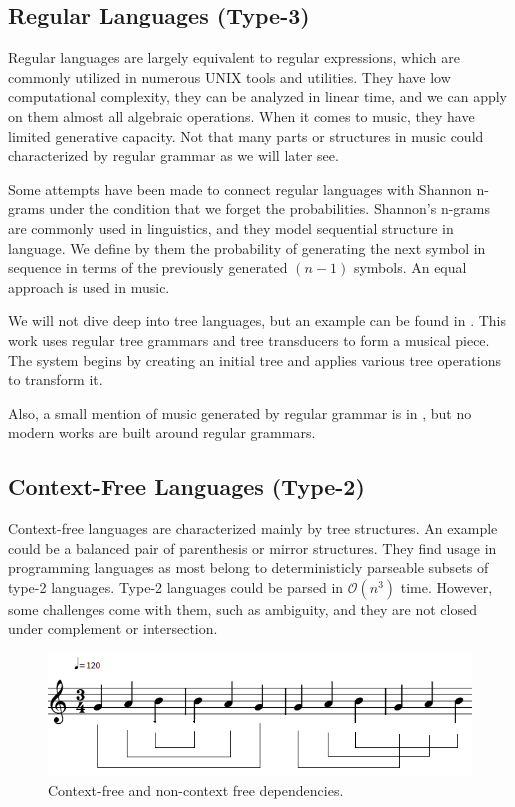 \subsection*{Regular Languages (Type-3)}
Regular languages are largely equivalent to regular expressions, which are commonly utilized in numerous UNIX tools and utilities. They have low computational complexity, they can be analyzed in linear time, and we can apply on them almost all algebraic operations. When it comes to music, they have limited generative capacity. Not that many parts or structures in music could characterized by regular grammar as we will later see.

Some attempts have been made to connect regular languages with Shannon n-grams \cite{musiclanguageanimals} under the condition that we forget the probabilities. Shannon's n-grams are commonly used in linguistics, and they model sequential structure in language. We define by them the probability of generating the next symbol in sequence in terms of the previously generated $(n - 1)$ symbols. An equal approach is used in music.

We will not dive deep into tree languages, but an example can be found in \cite{africathesis}. This work uses regular tree grammars and tree transducers to form a musical piece. The system begins by creating an initial tree and applies various tree operations to transform it.

Also, a small mention of music generated by regular grammar is in \cite{gramimprovisation}, but no modern works are built around regular grammars.

\subsection*{Context-Free Languages (Type-2)}
Context-free languages are characterized mainly by tree structures. An example could be a balanced pair of parenthesis or mirror structures. They find usage in programming languages as most belong to deterministicly parseable subsets of type-2 languages. Type-2 languages could be parsed in $\mathcal{O}(n^3)$ time. However, some challenges come with them, such as ambiguity, and they are not closed under complement or intersection.

\begin{figure}[H]
    \centering
    \includegraphics[scale=0.5]{obrazky-figures/mix-dependencies.png}
    \caption{Context-free and non-context free dependencies.}
    \label{fig:mixdepen}
\end{figure}

